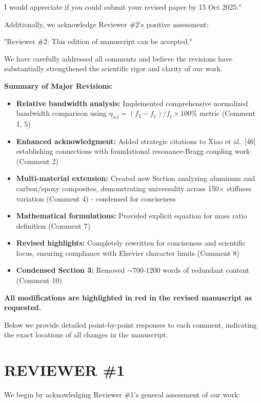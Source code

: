 \documentclass[11pt,a4paper]{article}
\begin{document}
I would appreciate if you could submit your revised paper by 15 Oct 2025."

Additionally, we acknowledge Reviewer \#2's positive assessment:

"Reviewer \#2: This edition of manuscript can be accepted."

We have carefully addressed all comments and believe the revisions have substantially strengthened the scientific rigor and clarity of our work.

\textbf{Summary of Major Revisions:}
\begin{itemize}[leftmargin=1.5cm]
    \item \textbf{Relative bandwidth analysis:} Implemented comprehensive normalized bandwidth comparison using $\eta_{rel} = (f_2-f_1)/f_c \times 100\%$ metric (Comment 1, 5)
    \item \textbf{Enhanced acknowledgment:} Added strategic citations to Xiao et al.~[46] establishing connections with foundational resonance-Bragg coupling work (Comment 2)
    \item \textbf{Multi-material extension:} Created new Section analyzing aluminum and carbon/epoxy composites, demonstrating universality across 150$\times$ stiffness variation (Comment 4) - condensed for conciseness
    \item \textbf{Mathematical formulations:} Provided explicit equation for mass ratio definition (Comment 7)
    \item \textbf{Revised highlights:} Completely rewritten for conciseness and scientific focus, ensuring compliance with Elsevier character limits (Comment 8)
    \item \textbf{Condensed Section 3:} Removed $\sim$700-1200 words of redundant content (Comment 10)
\end{itemize}

\textbf{All modifications are highlighted in \textcolor{redtext}{red} in the revised manuscript as requested.}

Below we provide detailed point-by-point responses to each comment, indicating the exact locations of all changes in the manuscript.

\newpage

\section*{REVIEWER \#1}

We begin by acknowledging Reviewer \#1's general assessment of our work:
\end{document}

